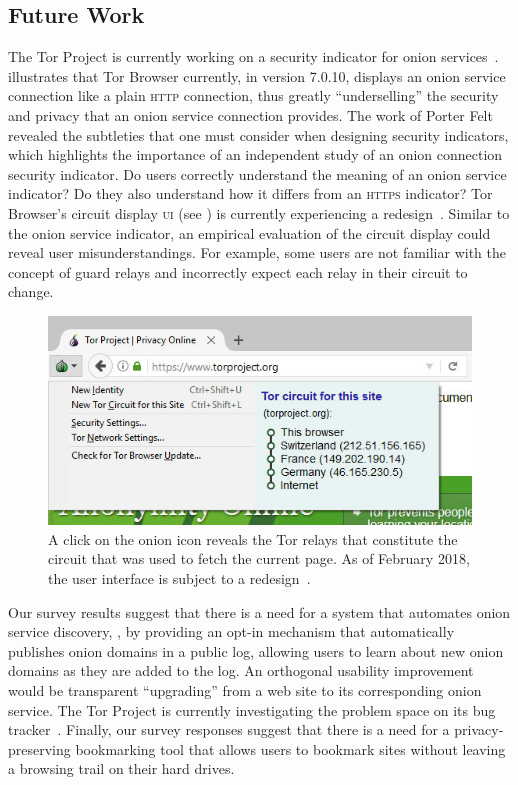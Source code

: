 \subsection{Future Work}
\label{sec:future-work}

The Tor Project is currently working on a security indicator for onion
services~\cite{trac23247}.   illustrates that Tor
Browser currently, in version 7.0.10, displays an onion service connection like
a plain \textsc{http} connection, thus greatly ``underselling'' the security and
privacy that an onion service connection provides.  The work of Porter Felt
\ea~\cite{Felt2016a} revealed the subtleties that one must consider when
designing security indicators, which highlights the importance of an independent
study of an onion connection security indicator.  Do users correctly understand
the meaning of an onion service indicator?  Do they also understand how it
differs from an \textsc{https} indicator?  Tor Browser's circuit display
\textsc{ui} (see ) is currently experiencing a
redesign~\cite{trac24309}.  Similar to the onion service indicator, an empirical
evaluation of the circuit display could reveal user misunderstandings.  For
example, some users are not familiar with the concept of guard relays and
incorrectly expect each relay in their circuit to change.

\begin{figure}[t]
    \centering
    \includegraphics[width=\linewidth]{figures/tor-button-screenshot.jpg}
    \caption{A click on the onion icon reveals the Tor relays that constitute
    the circuit that was used to fetch the current page.  As of February 2018,
    the user interface is subject to a redesign~\cite{trac24309}.}
    \label{fig:tor-button}
\end{figure}

Our survey results suggest that there is a need for a system that automates
onion service discovery, \eg, by providing an opt-in mechanism that
automatically publishes onion domains in a public log, allowing users to learn
about new onion domains as they are added to the log.  An orthogonal usability
improvement would be transparent ``upgrading'' from a web site to its
corresponding onion service.  The Tor Project is currently investigating the
problem space on its bug tracker~\cite{trac21952}.  Finally, our survey
responses suggest that there is a need for a privacy-preserving bookmarking tool
that allows users to bookmark sites without leaving a browsing trail on their
hard drives.
